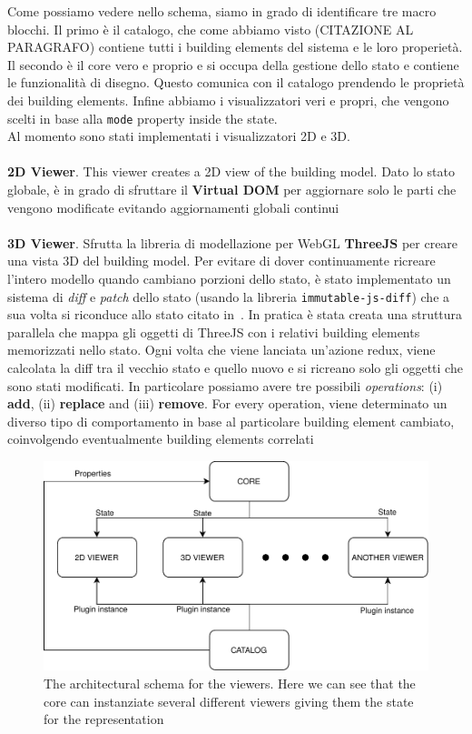 Come possiamo vedere nello schema, siamo in grado di identificare tre macro blocchi. Il primo è il catalogo, che come abbiamo visto (CITAZIONE AL PARAGRAFO) contiene tutti i building elements del sistema e le loro properiet\`a. Il secondo \`e il core vero e proprio e si occupa della gestione dello stato e contiene le funzionalità di disegno. Questo comunica con il catalogo prendendo le propriet\`a dei building elements. Infine abbiamo i visualizzatori veri e propri, che vengono scelti in base alla \texttt{mode} property inside the state.\\

Al momento sono stati implementati i visualizzatori 2D e 3D.\\\\
\textbf{2D Viewer}. This viewer creates a 2D view of the building model. Dato lo stato globale, è in grado di sfruttare il \textbf{Virtual DOM} per aggiornare solo le parti che vengono modificate evitando aggiornamenti globali continui\\\\
\textbf{3D Viewer}. Sfrutta la libreria di modellazione per WebGL \textbf{ThreeJS} per creare una vista 3D del building model. Per evitare di dover continuamente ricreare l'intero modello quando cambiano porzioni dello stato, \`e stato implementato un sistema di \textit{diff} e \textit{patch} dello stato (usando la libreria \texttt{immutable-js-diff}) che a sua volta si riconduce allo stato citato in~\cite{rfc6902}. In pratica è stata creata una struttura parallela che mappa gli oggetti di ThreeJS con i relativi building elements memorizzati nello stato. Ogni volta che viene lanciata un'azione redux, viene calcolata la diff tra il vecchio stato e quello nuovo e si ricreano solo gli oggetti che sono stati modificati. In particolare possiamo avere tre possibili \textit{operations}: (i) \textbf{add}, (ii) \textbf{replace} and (iii) \textbf{remove}. For every operation, viene determinato un diverso tipo di comportamento in base al particolare building element cambiato, coinvolgendo eventualmente building elements correlati

\begin{figure}[!t]
\centering
\includegraphics[width=\linewidth]{contents/images/diagramma-visualizzatori}

\caption{The architectural schema for the viewers. Here we can see that the core can instanziate several different viewers giving them the state for the representation}
\label{fig_viewers}
\end{figure}

